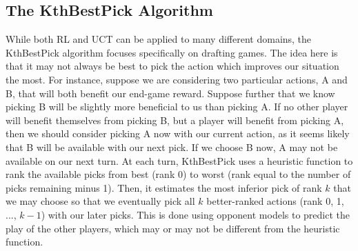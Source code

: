 \documentclass[letterpaper]{article}
\numberwithin{equation}{section}
\numberwithin{theorem}{section}
\numberwithin{lemma}{section}
\numberwithin{df}{section}
\begin{document}

\subsection{The KthBestPick Algorithm}
\label{sec:KthBestPick}

While both RL and UCT can be applied to many different domains, the KthBestPick algorithm focuses specifically on drafting games.  The idea here is that it may not always be best to pick the action which improves our situation the most.  For instance, suppose we are considering two particular actions, A and B, that will both benefit our end-game reward.  Suppose further that we know picking B will be slightly more beneficial to us than picking A.  If no other player will benefit themselves from picking B, but a player will benefit from picking A, then we should consider picking A now with our current action, as it seems likely that B will be available with our next pick.  If we choose B now, A may not be available on our next turn.  At each turn, KthBestPick uses a heuristic function to rank the available picks from best (rank 0) to worst (rank equal to the number of picks remaining minus 1).  Then, it estimates the most inferior pick of rank $k$ that we may choose so that we eventually pick all $k$ better-ranked actions (rank 0, 1, ..., $k-1$) with our later picks.  This is done using opponent models to predict the play of the other players, which may or may not be different from the heuristic function.
\end{document}
